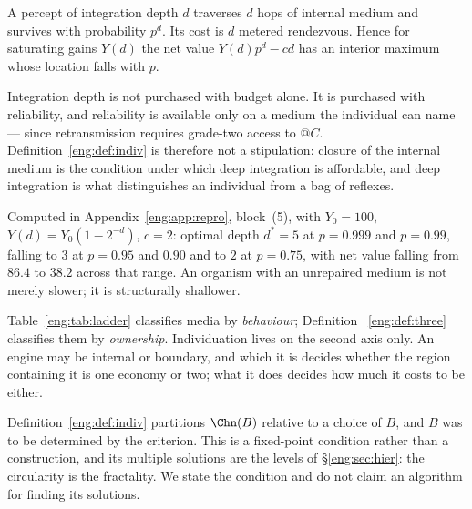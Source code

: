 \begin{proposition}
\label{eng:prop:fragile}
A percept of integration depth $d$ traverses $d$ hops of internal medium
and survives with probability $p^d$. Its cost is $d$ metered rendezvous.
Hence for saturating gains $Y(d)$ the net value $Y(d)p^d - cd$ has an
interior maximum whose location falls with $p$.
\end{proposition}

\begin{corollary}\label{eng:cor:owndepth}
Integration depth is not purchased with budget alone. It is purchased with
reliability, and reliability is available only on a medium the individual
can name --- since retransmission requires grade-two access to $@C$.
Definition~\ref{eng:def:indiv} is therefore not a stipulation: closure of the
internal medium is the condition under which deep integration is
affordable, and deep integration is what distinguishes an individual from a
bag of reflexes.
\end{corollary}

Computed in Appendix~\ref{eng:app:repro}, block~(5), with $Y_0 = 100$,
$Y(d) = Y_0(1-2^{-d})$, $c=2$: optimal depth $d^\ast = 5$ at $p = 0.999$
and $p=0.99$, falling to $3$ at $p = 0.95$ and $0.90$ and to $2$ at
$p = 0.75$, with net value falling from $86.4$ to $38.2$ across that range.
An organism with an unrepaired medium is not merely slower; it is
structurally shallower.

\begin{remark}\label{eng:two-axes}
Table~\ref{eng:tab:ladder} classifies media by \emph{behaviour}; Definition~
\ref{eng:def:three} classifies them by \emph{ownership}. Individuation lives on
the second axis only. An engine may be internal or boundary, and which it
is decides whether the region containing it is one economy or two; what it
does decides how much it costs to be either.
\end{remark}

\begin{remark}\label{eng:rem:fixpoint}
Definition~\ref{eng:def:indiv} partitions $\Chn(B)$ relative to a choice of
$B$, and $B$ was to be determined by the criterion. This is a fixed-point
condition rather than a construction, and its multiple solutions are the
levels of \S\ref{eng:sec:hier}: the circularity is the fractality. We state the
condition and do not claim an algorithm for finding its solutions.
\end{remark}


